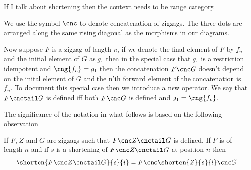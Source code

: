 \begin{aside}
If I talk about shortening then the context
needs to be  range category.
\end{aside}


\newcommand{\zigzagIsolationTailTuple}[3]
{
\tuple{\rng{#1_{#2+1}},#1'_{#2+1},...#1'_{#3-1},#1_{#3}} 
}
\begin{newtt}
We use the symbol $\cnc$ to denote concatenation of zigzags. The three dots are arranged along the same rising diagonal as the morphisms in our diagrams. 

Now suppose $F$ is a zigzag of length $n$, if we denote the final element of $F$ by $f_n$ and the initial element of
$G$ as $g_1$ then in the special case that $g_1$ is a restriction 
idempotent and  $\rng{f_n}=g_1$ then the concatenation
$F \cnc G$ doesn't depend on the inital element of $G$ and the n'th
forward element of the concatenation is $f_n$. To
document this special case then we introduce a new operator.
We say that $F \cnctail G$ is defined iff 
both $F \cnc G$ is defined and  $g_1 = \rng{f_n}$.
\end{newtt}

The significance of the notation in what follows is based
on the following observation
\begin{observation}

If $F$, $Z$ and $G$ are zigzags such that 
$F \cnc Z \cnctail G$ is defined, If $F$ is of length $n$
and if $s$ is a shortening of $F \cnc Z \cnctail G$ at
position $n$ then 
\[
\shorten{F \cnc Z \cnctail G}{s}{i} 
   = F \cnc \shorten{Z}{s}{i} \cnc G
\]
\end{observation}

